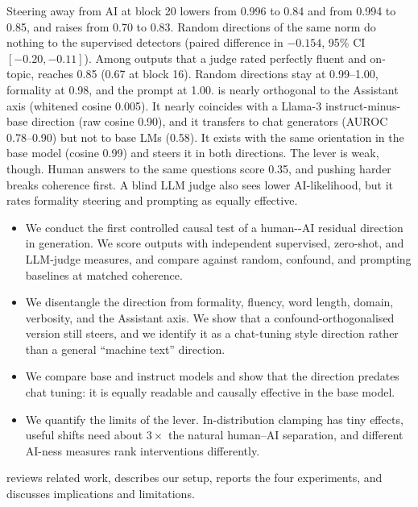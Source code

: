  Steering away from AI at block 20 lowers \desklib \pai from 0.996 to 0.84 and \fakespot from 0.994 to 0.85, and raises \binoculars from 0.70 to 0.83. Random directions of the same norm do nothing to the supervised detectors (paired difference in \desklib $-0.154$, 95\% CI $[-0.20,-0.11]$). Among outputs that a judge rated perfectly fluent and on-topic, \dai reaches 0.85 (0.67 at block 16). Random directions stay at 0.99--1.00, formality at 0.98, and the prompt at 1.00.
\dai is nearly orthogonal to the Assistant axis (whitened cosine 0.005). It nearly coincides with a Llama-3 instruct-minus-base direction (raw cosine 0.90), and it transfers to chat generators (AUROC 0.78--0.90) but not to base LMs (0.58). It exists with the same orientation in the base model (cosine 0.99) and steers it in both directions.
The lever is weak, though. Human answers to the same questions score 0.35, and pushing harder breaks coherence first. A blind LLM judge also sees \dai lower AI-likelihood, but it rates formality steering and prompting as equally effective.

\begin{itemize}[leftmargin=*,itemsep=0pt,topsep=0pt]
    \item We conduct the first controlled causal test of a human-\versus-AI residual direction in generation. We score outputs with independent supervised, zero-shot, and LLM-judge measures, and compare against random, confound, and prompting baselines at matched coherence.
    \item We disentangle the direction from formality, fluency, word length, domain, verbosity, and the Assistant axis. We show that a confound-orthogonalised version still steers, and we identify it as a chat-tuning style direction rather than a general ``machine text'' direction.
    \item We compare base and instruct models and show that the direction predates chat tuning: it is equally readable and causally effective in the base model.
    \item We quantify the limits of the lever. In-distribution clamping has tiny effects, useful shifts need about $3\times$ the natural human--AI separation, and different AI-ness measures rank interventions differently.
\end{itemize}

 reviews related work,  describes our setup,  reports the four experiments, and  discusses implications and limitations.
